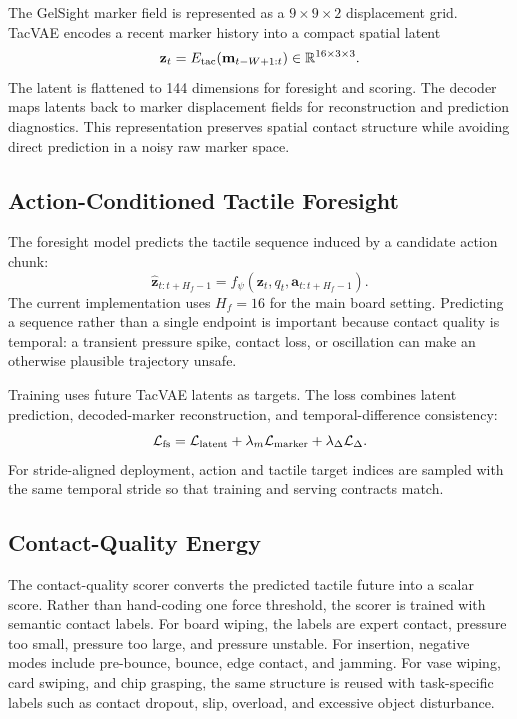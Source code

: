 \documentclass[letterpaper, 10 pt, conference]{ieeeconf}
\newcommand{\Real}{\mathbb{R}}
\newcommand{\loss}{\mathcal{L}}
\newcommand{\marker}{\mathbf{m}}
\newcommand{\action}{\mathbf{a}}
\newcommand{\latent}{\mathbf{z}}
\begin{document}
The GelSight marker field is represented as a $9 \times 9 \times 2$ displacement
grid. TacVAE encodes a recent marker history into a compact spatial latent
\begin{equation}
\latent_t = E_{\rm tac}(\marker_{t-W+1:t})
\in \Real^{16 \times 3 \times 3}.
\end{equation}
The latent is flattened to 144 dimensions for foresight and scoring. The
decoder maps latents back to marker displacement fields for reconstruction and
prediction diagnostics. This representation preserves spatial contact structure
while avoiding direct prediction in a noisy raw marker space.

\subsection{Action-Conditioned Tactile Foresight}

The foresight model predicts the tactile sequence induced by a candidate action
chunk:
\begin{equation}
\hat{\latent}_{t:t+H_f-1}
= f_\psi(\latent_t,q_t,\action_{t:t+H_f-1}).
\end{equation}
The current implementation uses $H_f=16$ for the main board setting. Predicting
a sequence rather than a single endpoint is important because contact quality is
temporal: a transient pressure spike, contact loss, or oscillation can make an
otherwise plausible trajectory unsafe.

Training uses future TacVAE latents as targets. The loss combines latent
prediction, decoded-marker reconstruction, and temporal-difference consistency:
\begin{equation}
\loss_{\rm fs}
= \loss_{\rm latent}
+ \lambda_m \loss_{\rm marker}
+ \lambda_\Delta \loss_\Delta .
\end{equation}
For stride-aligned deployment, action and tactile target indices are sampled
with the same temporal stride so that training and serving contracts match.

\subsection{Contact-Quality Energy}

The contact-quality scorer converts the predicted tactile future into a scalar
score. Rather than hand-coding one force threshold, the scorer is trained with
semantic contact labels. For board wiping, the labels are expert contact,
pressure too small, pressure too large, and pressure unstable. For insertion,
negative modes include pre-bounce, bounce, edge contact, and jamming. For vase
wiping, card swiping, and chip grasping, the same structure is reused with
task-specific labels such as contact dropout, slip, overload, and excessive
object disturbance.
\end{document}
